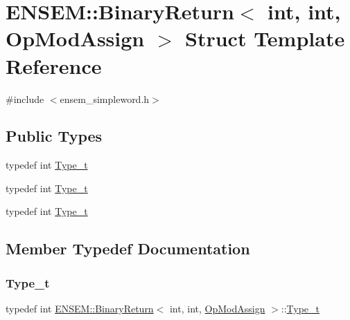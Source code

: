 \hypertarget{structENSEM_1_1BinaryReturn_3_01int_00_01int_00_01OpModAssign_01_4}{}\section{E\+N\+S\+EM\+:\+:Binary\+Return$<$ int, int, Op\+Mod\+Assign $>$ Struct Template Reference}
\label{structENSEM_1_1BinaryReturn_3_01int_00_01int_00_01OpModAssign_01_4}


{\ttfamily \#include $<$ensem\+\_\+simpleword.\+h$>$}

\subsection*{Public Types}
\begin{DoxyCompactItemize}
\item 
typedef int \mbox{\hyperlink{structENSEM_1_1BinaryReturn_3_01int_00_01int_00_01OpModAssign_01_4_a3b37439e87d2e89d2bf9f5b7738f2a61}{Type\+\_\+t}}
\item 
typedef int \mbox{\hyperlink{structENSEM_1_1BinaryReturn_3_01int_00_01int_00_01OpModAssign_01_4_a3b37439e87d2e89d2bf9f5b7738f2a61}{Type\+\_\+t}}
\item 
typedef int \mbox{\hyperlink{structENSEM_1_1BinaryReturn_3_01int_00_01int_00_01OpModAssign_01_4_a3b37439e87d2e89d2bf9f5b7738f2a61}{Type\+\_\+t}}
\end{DoxyCompactItemize}


\subsection{Member Typedef Documentation}
\mbox{\label{structENSEM_1_1BinaryReturn_3_01int_00_01int_00_01OpModAssign_01_4_a3b37439e87d2e89d2bf9f5b7738f2a61}} 
\subsubsection{\texorpdfstring{Type\_t}{Type\_t}\hspace{0.1cm}{\footnotesize\ttfamily [1/3]}}
{\footnotesize\ttfamily typedef int \mbox{\hyperlink{structENSEM_1_1BinaryReturn}{E\+N\+S\+E\+M\+::\+Binary\+Return}}$<$ int, int, \mbox{\hyperlink{structENSEM_1_1OpModAssign}{Op\+Mod\+Assign}} $>$\+::\mbox{\hyperlink{structENSEM_1_1BinaryReturn_3_01int_00_01int_00_01OpModAssign_01_4_a3b37439e87d2e89d2bf9f5b7738f2a61}{Type\+\_\+t}}}

